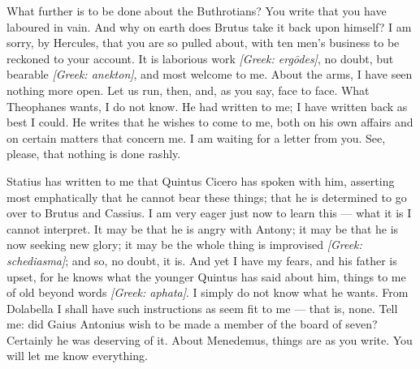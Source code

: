 

 What further is to be done about the Buthrotians? You write that you have laboured in vain. And why on earth does Brutus take it back upon himself? I am sorry, by Hercules, that you are so pulled about, with ten men's business to be reckoned to your account. It is laborious work \textit{[Greek: erg\=odes]}, no doubt, but bearable \textit{[Greek: anekton]}, and most welcome to me. About the arms, I have seen nothing more open. Let us run, then, and, as you say, face to face. What Theophanes wants, I do not know. He had written to me; I have written back as best I could. He writes that he wishes to come to me, both on his own affairs and on certain matters that concern me. I am waiting for a letter from you. See, please, that nothing is done rashly.

 Statius has written to me that Quintus Cicero has spoken with him, asserting most emphatically that he cannot bear these things; that he is determined to go over to Brutus and Cassius. I am very eager just now to learn this --- what it is I cannot interpret. It may be that he is angry with Antony; it may be that he is now seeking new glory; it may be the whole thing is improvised \textit{[Greek: schediasma]}; and so, no doubt, it is. And yet I have my fears, and his father is upset, for he knows what the younger Quintus has said about him, things to me of old beyond words \textit{[Greek: aphata]}. I simply do not know what he wants. From Dolabella I shall have such instructions as seem fit to me --- that is, none. Tell me: did Gaius Antonius wish to be made a member of the board of seven? Certainly he was deserving of it. About Menedemus, things are as you write. You will let me know everything.
